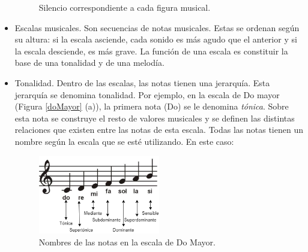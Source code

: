 \documentclass[a4paper, openright, 11pt, titlepage]{report}
\theoremstyle{definition}\newtheorem{defin}[propo]{Definition}
\theoremstyle{definition}\newtheorem{obser}[propo]{Remark}
\theoremstyle{definition}\newtheorem{ejem}[propo]{Ejemplo}
\theoremstyle{definition}\newtheorem{algoritmo}[propo]{Algoritmo}
\begin{document}
\begin{itemize}
\begin{figure}[H]
            \caption{Silencio correspondiente a cada figura musical. \cite{figura}}
            \label{silencios}
    \end{figure}
    \item Escalas musicales. Son secuencias de notas musicales. Estas se ordenan según su altura: si la escala asciende, cada sonido es más agudo que el anterior y si la escala desciende, es más grave. La función de una escala es constituir la base de una tonalidad y de una melodía.
    \item Tonalidad. Dentro de las escalas, las notas tienen una jerarquía. Esta jerarquía se denomina tonalidad. Por ejemplo, en la escala de Do mayor (Figura \ref{doMayor} (a)), la primera nota (Do) se le denomina \textit{tónica}. Sobre esta nota se construye el resto de valores musicales y se definen las distintas relaciones que existen entre las notas de esta escala. Todas las notas tienen un nombre según la escala que se esté utilizando. En este caso:
    \begin{figure}[H]
        \centering
        \includegraphics[width = 0.5\textwidth]{Images/Apéndices/Apéndice A/tonalidad.png}
        \caption{Nombres de las notas en la escala de Do Mayor.}
    \end{figure}
\end{itemize}
\end{document}
